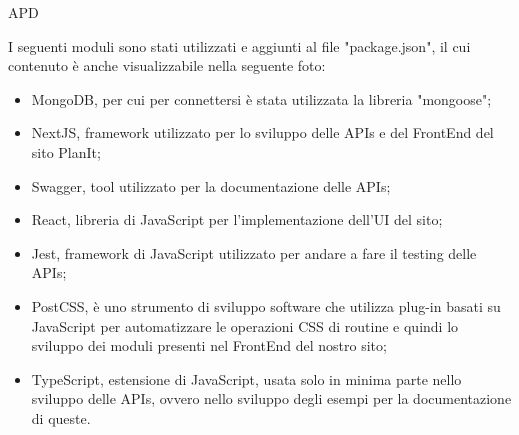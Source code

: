 \begin{listaPersonale} {APD}

    \newpage
    I seguenti moduli sono stati utilizzati e aggiunti al file "package.json", il cui contenuto è anche visualizzabile nella seguente foto:
    \begin{itemize}
        \item MongoDB, per cui per connettersi  è stata utilizzata la libreria "mongoose";
        \item NextJS, framework utilizzato per lo sviluppo delle APIs e del FrontEnd del sito PlanIt;
        \item Swagger, tool utilizzato per la documentazione delle APIs;
        \item React, libreria di JavaScript per l'implementazione dell'UI del sito;
        \item Jest, framework di JavaScript utilizzato per andare a fare il testing delle APIs;
        \item PostCSS, è uno strumento di sviluppo software che utilizza plug-in basati su JavaScript per automatizzare le operazioni CSS di routine e quindi lo sviluppo dei moduli presenti nel FrontEnd del nostro sito;
        \item TypeScript, estensione di JavaScript, usata solo in minima parte nello sviluppo delle APIs, ovvero nello sviluppo degli esempi per la documentazione di queste.
    \end{itemize}
    \begin{center}

\end{center}
\end{listaPersonale}
